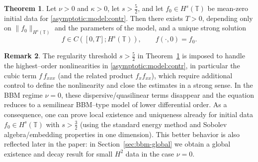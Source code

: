 \documentclass[reqno]{amsart}
\newcommand{\TT}{\mathbb T}
\theoremstyle{definition}
\newtheorem{theorem}{Theorem}
\newtheorem{remark}[theorem]{Remark}
\numberwithin{equation}{section}
\numberwithin{theorem}{section}
\numberwithin{definition}{section}
\begin{document}
\begin{theorem}\label{th:existence:strong}
	Let $\nu>0$ and $\kappa>0$, let $s>\frac{5}{2}$, and let $f_0\in H^s(\TT)$ be mean-zero initial data for \eqref{asymptotic:model:contr}.
	Then there exists $T>0$, depending only on $\|f_0\|_{H^s(\TT)}$ and the parameters of the model, and a unique strong solution
	\[
	f\in C([0,T];H^s(\TT)),\qquad f(\cdot,0)=f_0.
	\]
\end{theorem}
\begin{remark}
	The regularity threshold $s>\frac52$ in Theorem~\ref{th:existence:strong} is imposed to handle the highest--order nonlinearities
	in \eqref{asymptotic:model:contr}, in particular the cubic term $f\,f_{xxx}$ (and the related product $f_x f_{xx}$), which
	require additional control to define the nonlinearity and close the estimates in a strong sense.
	In the BBM regime $\nu=0$, these dispersive/quasilinear terms disappear and the equation reduces to a semilinear BBM--type model of lower differential order. As a consequence, one can prove local existence and uniqueness already for initial data
	$f_0\in H^s(\TT)$ with $s>\frac32$ (using the standard energy method and Sobolev algebra/embedding properties in one dimension).
	This better behavior is also reflected later in the paper: in Section~\ref{sec:bbm-global} we obtain a global existence and decay result 	for small $H^2$ data in the case $\nu=0$.
\end{remark}
\end{document}
